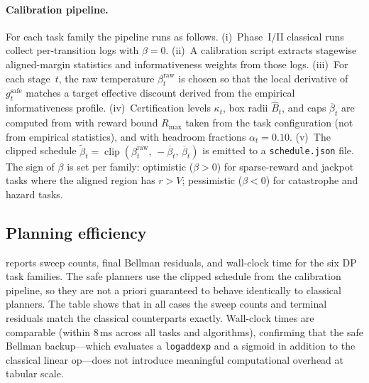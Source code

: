 \documentclass{article}
\theoremstyle{remark}
\DeclareMathOperator{\clip}{clip}
\newcommand{\safe}{\mathrm{safe}}
\begin{document}
\paragraph{Calibration pipeline.}
For each task family the pipeline runs as follows.
(i)~Phase~I/II classical runs collect per-transition logs with $\beta=0$.
(ii)~A calibration script extracts stagewise aligned-margin statistics and informativeness weights from those logs.
(iii)~For each stage~$t$, the raw temperature $\beta_t^{\mathrm{raw}}$ is chosen so that the local derivative of $g_t^{\safe}$ matches a target effective discount derived from the empirical informativeness profile.
(iv)~Certification levels $\kappa_t$, box radii $\hat{B}_t$, and caps $\overline\beta_t$ are computed from  with reward bound $R_{\max}$ taken from the task configuration (not from empirical statistics), and with headroom fractions $\alpha_t=0.10$.
(v)~The clipped schedule $\widetilde\beta_t = \clip(\beta_t^{\mathrm{raw}},\,-\overline\beta_t,\,\overline\beta_t)$ is emitted to a \texttt{schedule.json} file.
The sign of $\beta$ is set per family: optimistic ($\beta>0$) for sparse-reward and jackpot tasks where the aligned region has $r>V$; pessimistic ($\beta<0$) for catastrophe and hazard tasks.

\subsection{Planning efficiency}
\label{sec:exp-dp}

 reports sweep counts, final Bellman residuals, and wall-clock time for the six DP task families.
The safe planners use the clipped schedule from the calibration pipeline, so they are not a priori guaranteed to behave identically to classical planners.
The table shows that in all cases the sweep counts and terminal residuals match the classical counterparts exactly.
Wall-clock times are comparable (within 8\,ms across all tasks and algorithms), confirming that the safe Bellman backup---which evaluates a \texttt{logaddexp} and a sigmoid in addition to the classical linear op---does not introduce meaningful computational overhead at tabular scale.

\begin{table}[t]
\centering
\small
\caption{DP planning: sweep counts, final Bellman residual, and wall-clock time (mean $\pm$ std across seeds). Safe algorithms use the calibrated clipped schedule. Residuals are identical to classical because the deployed $\widetilde\beta_t$ is in the near-zero regime.}
\label{tab:dp-planning}

\end{table}
\end{document}
